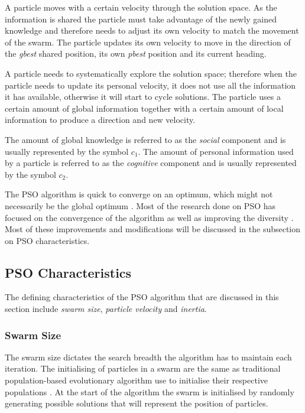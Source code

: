 A particle moves with a certain velocity through the solution space. As the information is shared the particle must take advantage of the newly gained knowledge and therefore needs to adjust its own velocity to match the movement of the swarm. The particle updates its own velocity to move in the direction of the \emph{gbest} shared position, its own \emph{pbest} position and its current heading.

A particle needs to systematically explore the solution space; therefore when the particle needs to update its personal velocity, it does not use all the information it has available, otherwise it will start to cycle solutions. The particle uses a certain amount of global information together with a certain amount of local information to produce a direction and new velocity\cite{FundamentalSwarm,CompuIntelligenceIntro,PSOSelfHierarch,SOSwarm}. 

The amount of global knowledge is referred to as the \emph{social} \label{def:socialcomponent} component \cite{FundamentalSwarm,CompuIntelligenceIntro,PSOSelfHierarch,SOSwarm} and is usually represented by the symbol $c_1$. The amount of personal information used by a particle is referred to as the \emph{cognitive} \label{def:cognitivecomponent} component and is usually represented by the symbol $c_2$\cite{FundamentalSwarm,CompuIntelligenceIntro,PSOSelfHierarch,SOSwarm}.

The PSO algorithm is quick to converge on an optimum, which might not necessarily be the global optimum \cite{PSOSelfHierarch}. Most of the research done on PSO has focused on the convergence of the algorithm as well as improving the diversity \cite{FundamentalSwarm}. Most of these improvements and modifications will be discussed in the subsection on PSO characteristics.

\subsection{PSO Characteristics}
\label{sec:psocharacteristics}
The defining characteristics of the PSO algorithm that are discussed in this section include \emph{swarm size}, \emph{particle velocity} and \emph{inertia}.
\subsubsection{Swarm Size}
The swarm size dictates the search breadth the algorithm has to maintain each iteration\cite{FixedFAPPSO,CompuIntelligenceIntro}. The initialising of particles in a swarm are the same as traditional population-based evolutionary algorithm use to initialise their respective populations \cite{FixedFAPPSO}.  At the start of the algorithm the swarm is initialised by randomly generating possible solutions that will represent the position of particles\cite{CompuIntelligenceIntro}. 

